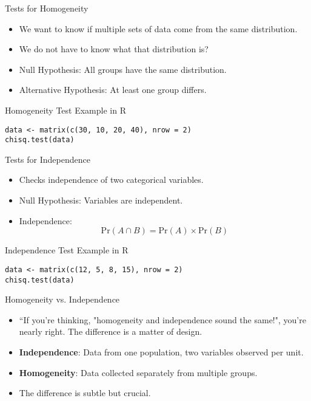 \documentclass{beamer}
\begin{document}
\begin{frame}{Tests for Homogeneity}
    \begin{itemize}
        \item We want to know if multiple sets of data come from the same distribution.
        \item We do not have to know what that distribution is?
        \item Null Hypothesis: All groups have the same distribution.
        \item Alternative Hypothesis: At least one group differs.
    \end{itemize}
\end{frame}
\begin{frame}[fragile]{Homogeneity Test Example in R}
\begin{verbatim}
data <- matrix(c(30, 10, 20, 40), nrow = 2)
chisq.test(data)
\end{verbatim}
\end{frame}
\begin{frame}{Tests for Independence}
    \begin{itemize}
        \item Checks independence of two categorical variables.
        \item Null Hypothesis: Variables are independent.
        \item Independence:
        \[ \text{Pr}(A \cap B) = \text{Pr}(A) \times \text{Pr}(B) \]
    \end{itemize}
\end{frame}
\begin{frame}[fragile]{Independence Test Example in R}
\begin{verbatim}
data <- matrix(c(12, 5, 8, 15), nrow = 2)
chisq.test(data)
\end{verbatim}
\end{frame}
\begin{frame}{Homogeneity vs. Independence}
    \begin{itemize}
        \item “If you're thinking, "homogeneity and independence sound the same!", you're nearly right. The difference is a matter of design. 
        \item \textbf{Independence}: Data from one population, two variables observed per unit.
        \item \textbf{Homogeneity}: Data collected separately from multiple groups.
        \item The difference is subtle but crucial.
    \end{itemize}
\end{frame}
\end{document}

